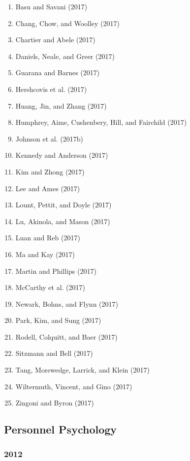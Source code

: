 \documentclass[english,man]{apa6}
\providecommand{\tightlist}{%
  \setlength{\itemsep}{0pt}\setlength{\parskip}{0pt}}
\theoremstyle{definition}
\theoremstyle{definition}
\theoremstyle{definition}
\theoremstyle{remark}
\begin{document}
\begin{enumerate}
\def\labelenumi{\arabic{enumi})}
\tightlist
\item
  Basu and Savani (2017)
\item
  Chang, Chow, and Woolley (2017)
\item
  Chartier and Abele (2017)
\item
  Daniels, Neale, and Greer (2017)
\item
  Guarana and Barnes (2017)
\item
  Hershcovis et al. (2017)
\item
  Huang, Jin, and Zhang (2017)
\item
  Humphrey, Aime, Cushenbery, Hill, and Fairchild (2017)
\item
  Johnson et al. (2017b)
\item
  Kennedy and Anderson (2017)
\item
  Kim and Zhong (2017)
\item
  Lee and Ames (2017)
\item
  Lount, Pettit, and Doyle (2017)
\item
  Lu, Akinola, and Mason (2017)
\item
  Luan and Reb (2017)
\item
  Ma and Kay (2017)
\item
  Martin and Phillips (2017)
\item
  McCarthy et al. (2017)
\item
  Newark, Bohns, and Flynn (2017)
\item
  Park, Kim, and Sung (2017)
\item
  Rodell, Colquitt, and Baer (2017)
\item
  Sitzmann and Bell (2017)
\item
  Tang, Morewedge, Larrick, and Klein (2017)
\item
  Wiltermuth, Vincent, and Gino (2017)
\item
  Zingoni and Byron (2017)
\end{enumerate}

\subsection{Personnel Psychology}\label{personnel-psychology}

\subsubsection{2012}\label{section-30}
\end{document}
